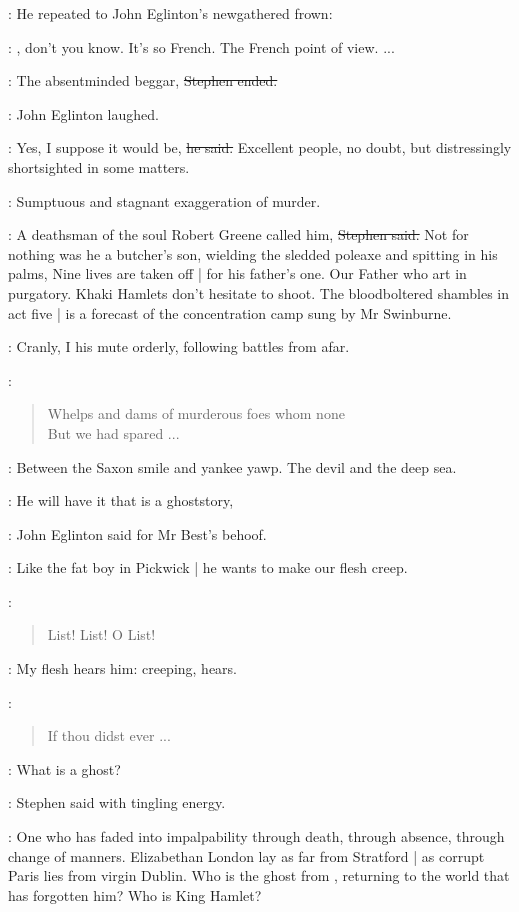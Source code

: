 :
He repeated to John Eglinton's newgathered frown:

\best:
,
don't you know.
It's so French.
The French point of view.
 ...

\Stephen:
The absentminded beggar,
\sout{Stephen ended.}

:
John Eglinton laughed.

\eglinton:
Yes,
I suppose it would be,
\sout{he said.}
Excellent people,
no doubt,
but distressingly shortsighted in some matters.

\StephenInt:
Sumptuous and stagnant exaggeration of murder.

\Stephen:
A deathsman of the soul Robert Greene called him,
\sout{Stephen said.}
Not for nothing was he a butcher's son,
wielding the sledded poleaxe and spitting in his palms,
Nine lives are taken off |
for his father's one.
Our Father who art in purgatory.
Khaki Hamlets don't hesitate to shoot.
The bloodboltered shambles in act five |
is a forecast of the concentration camp sung by Mr Swinburne.

\StephenInt:
Cranly,
I his mute orderly,
following battles from afar.

\StephenInt:
\begin{verse}
    Whelps and dams of murderous foes whom none \\
    But we had spared ...
\end{verse}

\StephenInt:
Between the Saxon smile and yankee yawp.
The devil and the deep sea.%

\eglinton:
He will have it that  is a ghoststory,

:
John Eglinton said for Mr Best's behoof.

\eglinton:
Like the fat boy in Pickwick |
he wants to make our flesh creep.

\StephenInt:
\begin{verse}
    List! List! O List!
\end{verse}

\StephenInt:
My flesh hears him:
creeping, hears.

\StephenInt:
\begin{verse}
    If thou didst ever ...
\end{verse}

\Stephen:
What is a ghost?

:
Stephen said with tingling energy.

\Stephen:
One who has faded into impalpability through death,
through absence,
through change of manners.
Elizabethan London lay as far from Stratford |
as corrupt Paris lies from virgin Dublin.
Who is the ghost from ,
returning to the world that has forgotten him?
Who is King Hamlet?

